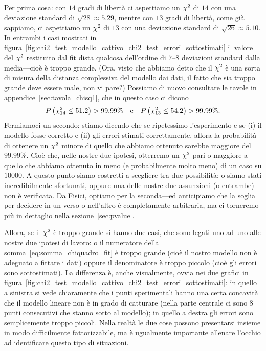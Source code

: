 Per prima cosa: con $14$ gradi di libertà ci aspettiamo un $\chi^2$ di
$14$ con una deviazione standard di $\sqrt{28} \approx 5.29$, mentre con $13$
gradi di libertà, come già sappiamo, ci aspettiamo un $\chi^2$ di $13$
con una deviazione standard di $\sqrt{26} \approx 5.10$. In entrambi i casi
mostrati in
figura~\ref{fig:chi2_test_modello_cattivo_chi2_test_errori_sottostimati} il
valore del $\chi^2$ restituito dal fit dista qualcosa dell'ordine di $7$--$8$
deviazioni standard dalla media---cioè è troppo grande. (Ora, visto che
abbiamo detto che il $\chi^2$ è una sorta di misura della distanza
complessiva del modello dai dati, il fatto che sia troppo grande deve essere
male, non vi pare?) Possiamo di nuovo consultare le tavole in
appendice~\ref{sec:tavola_chisq1}, che in questo caso ci dicono
\begin{align*}
  \displaystyle P\left(\chi^2_{14} \leq 51.2\right) > 99.99\% \quad \text{e} \quad
  \displaystyle P\left(\chi^2_{13} \leq 54.2\right) > 99.99\%.
\end{align*}
Fermiamoci un secondo: stiamo dicendo che se ripetessimo l'esperimento e se (i)
il modello fosse corretto e (ii) gli errori stimati correttamente, allora la
probabilità di ottenere un $\chi^2$ minore di quello che abbiamo ottenuto
sarebbe maggiore del $99.99\%$. Cioè che, nelle nostre due ipotesi, otterremo
un $\chi^2$ pari o maggiore a quello che abbiamo ottenuto in meno (e
probabilmente molto meno) di un caso su $10000$. A questo punto siamo costretti
a scegliere tra due possibilità: o siamo stati incredibilmente sfortunati,
oppure una delle nostre due assunzioni (o entrambe) non è verificata.
Da Fisici, optiamo per la seconda---ed anticipiamo che la soglia per decidere
in un verso o nell'altro è completamente arbitraria, ma ci torneremo più in
dettaglio nella sezione~\ref{sec:pvalue}.

Allora, se il $\chi^2$ è troppo grande si hanno due casi, che sono legati uno
ad uno alle nostre due ipotesi di lavoro: o il numeratore della
somma~\eqref{eq:somma_chiquadro_fit} è troppo grande (cioè il nostro
modello non è adeguato a fittare i dati) oppure il denominatore è troppo
piccolo (cioè gli errori sono sottostimati). La differenza è, anche
visualmente, ovvia nei due grafici in
figura~\ref{fig:chi2_test_modello_cattivo_chi2_test_errori_sottostimati}: in
quello a sinistra si vede chiaramente che i punti sperimentali hanno una certa
concavità che il modello lineare non è in grado di catturare (nella parte
centrale ci sono $8$ punti consecutivi che stanno sotto al modello); in quello
a destra gli errori sono semplicemente troppo piccoli. Nella realtà le due
cose possono presentarsi insieme in modo difficilmente fattorizzabile, ma è
ugualmente importante allenare l'occhio ad identificare questo tipo di
situazioni.

